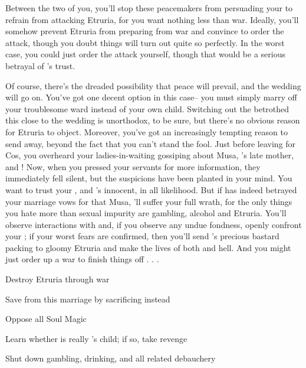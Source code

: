\documentclass[char]{Kos}
\begin{document}
Between the two of you, you'll stop these peacemakers from persuading your \cScythiaKing{\spouse} to refrain from attacking Etruria, for you want nothing less than war. Ideally, you'll somehow prevent Etruria from preparing from war and convince \cScythiaKing{} to order the attack, though you doubt things will turn out quite so perfectly. In the worst case, you could just order the attack yourself, though that would be a serious betrayal of \cScythiaKing{}'s trust.

Of course, there's the dreaded possibility that peace will prevail, and the wedding will go on. You've got one decent option in this case-- you must simply marry off your troublesome ward instead of your own child. Switching out the betrothed this close to the wedding is unorthodox, to be sure, but there's no obvious reason for Etruria to object. Moreover, you've got an increasingly tempting reason to send \cWard{\them} away,  beyond the fact that you can't stand the fool. Just before leaving for Cos, you overheard your ladies-in-waiting gossiping about Musa, \cWard{}'s late mother, and \cScythiaKing{}! Now, when you pressed your servants for more information, they immediately fell silent, but the suspicions have been planted in your mind. You want to trust your \cScythiaKing{\spouse}, and \cScythiaKing{\they}'s innocent, in all likelihood. But if \cScythiaKing{} has indeed betrayed your marriage vows for that Musa, \cScythiaKing{\they}'ll suffer your full wrath, for the only things you hate more than sexual impurity are gambling, alcohol and Etruria. You'll observe \cScythiaKing{\their} interactions with \cWard{} and, if you observe any undue fondness, openly confront your \cScythiaKing{\spouse}; if your worst fears are confirmed, then you'll send \cScythiaKing{}'s precious bastard packing to gloomy Etruria and make the lives of both \cScythiaKing{\parent} and \cWard{\offspring} hell. And you might just order up a war to finish things off . . .


\begin{itemz}[Goals]
\item Destroy Etruria through war
\item Save \cBride{} from this marriage by sacrificing \cWard{} instead
\item Oppose all Soul Magic
\item Learn whether \cWard{} is really \cScythiaKing{}'s child; if so, take revenge
\item Shut down gambling, drinking, and all related debauchery
\end{itemz}
\end{document}
